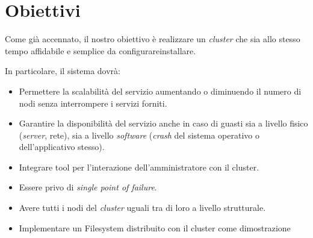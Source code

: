 
\section{Obiettivi}
Come già accennato, il nostro obiettivo è realizzare un \textit{cluster} che sia allo stesso tempo 
affidabile e semplice da configurare\/installare.

In particolare, il sistema dovrà:
\begin{itemize}
    \item Permettere la scalabilità del servizio aumentando o diminuendo il numero di nodi senza 
        interrompere i servizi forniti.
    \item Garantire la disponibilità del servizio anche in caso di guasti sia a livello fisico 
        (\textit{server}, rete), sia a livello \textit{software} (\textit{crash} del sistema 
        operativo o dell'applicativo stesso).
    \item Integrare tool per l'interazione dell'amministratore con il cluster.
    \item Essere privo di \textit{single point of failure}.
    \item Avere tutti i nodi del \textit{cluster} uguali tra di loro a livello strutturale.
    \item Implementare un Filesystem distribuito con il cluster come dimostrazione
\end{itemize}
